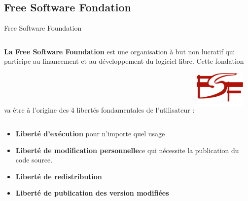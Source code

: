 \subsection{Free Software Fondation}
\begin{frame}[t,fragile]{Free Software Foundation}
    \begin{columns}
        \textbf{La Free Software Foundation} est une organisation à but non lucratif qui participe au financement et au développement du logiciel libre. \linebreak Cette fondation va être à l'origine des 4 libertés fondamentales de l'utilisateur :
    \includegraphics[height=2.5cm, width=2.5cm]{logo_fsf} \pause
        \end{columns}
            \begin{itemize}
                \item \textbf{Liberté d’exécution} pour n'importe quel usage\pause
                \item \textbf{Liberté de modification personnelle}\linebreak ce qui nécessite la publication du code source.\pause
                \item \textbf{Liberté de redistribution} \pause
                 \item \textbf{Liberté de publication des version modifiées}
            \end{itemize}
\end{frame}


